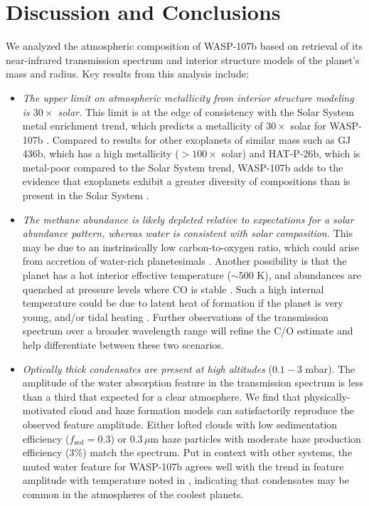 \documentclass[twocolumn, trackchanges]{aastex61}
\begin{document}
\section{Discussion and Conclusions} \label{sec:discuss}
We analyzed the atmospheric composition of WASP-107b based on retrieval of its near-infrared transmission spectrum and interior structure models of the planet's mass and radius.  Key results from this analysis include:

\begin{itemize}
\item{\emph{The upper limit on atmospheric metallicity from interior structure modeling is $30\times$ solar.} This limit is at the edge of consistency with the Solar System metal enrichment trend, which predicts a metallicity of $30\times$ solar for WASP-107b \citep{kreidberg14b}.  Compared to results for other exoplanets of similar mass such as GJ 436b, which has a high metallicity ($>100\times$ solar) and HAT-P-26b, which is metal-poor compared to the Solar System trend, WASP-107b adds to the evidence that exoplanets exhibit a greater diversity of compositions than is present in the Solar System \citep{morley17, wakeford17}.}
\item{\emph{The methane abundance is likely depleted relative to expectations for a solar abundance pattern, whereas water is consistent with solar composition.} This may be due to an instrinsically low carbon-to-oxygen ratio, which could arise from accretion of water-rich planetesimals \citep{mordasini16, espinoza17}.  Another possibility is that the planet has a hot interior effective temperature ($\sim500$ K), and abundances are quenched at pressure levels where CO is stable \citep[as observed in some directly imaged planets;][]{skemer14, zahnle14}. Such a high internal temperature could be due to latent heat of formation if the planet is very young, and/or tidal heating \citep{fortney08, morley17}. Further observations of the transmission spectrum over a broader wavelength range will refine the C/O estimate and help differentiate between these two scenarios.} 
\item{\emph{Optically thick condensates are present at high altitudes} ($0.1 - 3$ mbar). The amplitude of the water absorption feature in the transmission spectrum is less than a third that expected for a clear atmosphere.  We find that physically-motivated cloud and haze formation models can satisfactorily reproduce the observed feature amplitude. Either lofted clouds with low sedimentation efficiency ($f_\mathrm{sed} = 0.3$) or $0.3\,\mu$m haze particles with moderate haze production efficiency (3\%) match the spectrum. Put in context with other systems, the muted water feature for WASP-107b agrees well with the trend in feature amplitude with temperature noted in \cite{crossfield17}, indicating that condensates may be common in the atmospheres of the coolest planets.}
\end{itemize}
\end{document}
